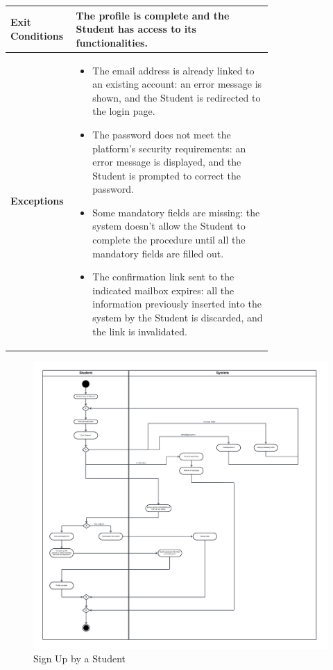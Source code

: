 \begin{center}
\begin{longtable}{|l|p{0.75\linewidth}|}
        \hline
        \textbf{Exit Conditions}   & The profile is complete and the Student has access to its functionalities.\\       
        \hline
        \textbf{Exceptions}       & \begin{itemize}
            \item The email address is already linked to an existing account: an error message is shown, and the Student is redirected to the login page.
            \item The password does not meet the platform's security requirements: an error message is displayed, and the Student is prompted to correct the password.
            \item Some mandatory fields are missing: the system doesn't allow the Student to complete the procedure until all the mandatory fields are filled out.
            \item The confirmation link sent to the indicated mailbox expires: all the information previously inserted into the system by the Student is discarded, and the link is invalidated.
        \end{itemize} \\
        \hline
    \end{longtable}
\end{center}

\begin{figure}[H]
    \begin{center}
         \includegraphics[width=1\linewidth]{LaTeXCode/images/activity diagram/UC1.png}
         \caption{Sign Up by a Student}
         \label{fig:signup_student_ad}
     \end{center}
\end{figure}

